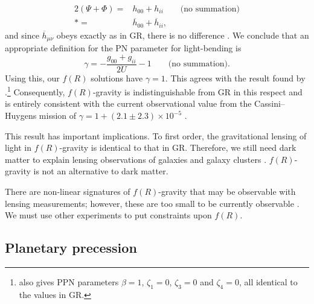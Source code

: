 \begin{align}
2\left(\Psi + \Phi\right) = {} & h_{00} + h_{ii} \qquad \text{(no summation)}\nonumber \\*
 = {} & \overline{h}_{00} + \overline{h}_{ii},
\end{align}
and since $\overline{h}_{\mu\nu}$ obeys  exactly as in GR, there is no difference \citep{Zhao2011}. We conclude that an appropriate definition for the PN parameter for light-bending is
\begin{equation}
\gamma = -\dfrac{g_{00} + g_{ii}}{2U} - 1 \qquad \text{(no summation)}.
\end{equation}
Using this, our $f(R)$ solutions have $\gamma = 1$. This agrees with the result found by \citet{Clifton2008}.\footnote{\citet{Clifton2008} also gives PPN parameters $\beta = 1$, $\zeta_1 = 0$, $\zeta_3 = 0$ and $\zeta_4 = 0$, all identical to the values in GR.} Consequently, $f(R)$-gravity is indistinguishable from GR in this respect and is entirely consistent with the current observational value from the Cassini--Huygens mission of $\gamma = 1 + (2.1 \pm 2.3) \times 10^{-5}$ \citep{Will2006, Bertotti2003}.

This result has important implications. To first order, the gravitational lensing of light in $f(R)$-gravity is identical to that in GR. Therefore, we still need dark matter to explain lensing observations of galaxies and galaxy clusters \citep{Lubini2011}. $f(R)$-gravity is not an alternative to dark matter.

There are non-linear signatures of $f(R)$-gravity that may be observable with lensing measurements; however, these are too small to be currently observable \citep{Vanderveld2011}. We must use other experiments to put constraints upon $f(R)$.

\subsection{Planetary precession}

